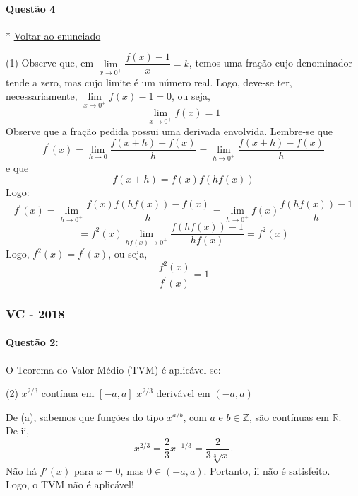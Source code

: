 \documentclass[12pt,a4paper]{article}
\begin{document}
\paragraph{Questão 4} \hfill \scriptsize \hypertarget{calculove12017q4ida}{* }\hyperlink{calculove12017q4volta}{Voltar ao enunciado} \normalsize

\begin{tasks}(1)
\task Observe que, em $\lim\limits_{x\to 0^+} \dfrac{f(x)-1}{x} = k$, temos uma fração cujo denominador tende a zero, mas cujo limite é um número real. Logo, deve-se ter, necessariamente, $\lim\limits_{x\to 0^+}f(x) - 1 = 0$, ou seja, $$\lim\limits_{x\to 0^+} f(x) = 1$$
\task Observe que a fração pedida possui uma derivada envolvida. Lembre-se que $$f^{\prime}(x) = \lim\limits_{h\to 0} \dfrac{f(x+h) - f(x)}{h} = \lim\limits_{h\to 0^+} \dfrac{f(x+h) - f(x)}{h}$$ e que $$f(x+h) = f(x) f(hf(x))$$
Logo: $$f^{\prime}(x) = \lim\limits_{h\to 0^+} \dfrac{f(x) f(hf(x)) - f(x)}{h} = \lim\limits_{h\to 0^+} f(x)\dfrac{f(hf(x)) - 1}{h}$$ $$ = f^2(x)\lim\limits_{hf(x)\to 0^+} \dfrac{f(hf(x)) - 1}{hf(x)} = f^2(x)$$ Logo, $f^2(x) = f^{\prime}(x)$, ou seja,  $$\dfrac{f^2(x)}{f^{\prime}(x) } = 1$$

\end{tasks}

\newpage

\subsubsection{VC - 2018}

\paragraph{Questão 2:}

O Teorema do Valor Médio (TVM) é aplicável se: 
    \begin{tasks}(2)
        \task $x^{2/3}$ contínua em $\left[-a, a\right]$
        \task $x^{2/3}$ derivável em $\left(-a, a\right)$        
    \end{tasks}

    De (a), sabemos que funções do tipo $x^{a/b}$, com $a$ e $b \in \mathbb{Z}$, são contínuas em $\mathbb{R}$.\\
    De ii, $$x^{2/3} = \dfrac{2}{3}x^{-1/3} = \dfrac{2}{3 \sqrt[3]{x}}. $$
    Não há $f'(x)$ para $x=0$, mas $0 \in \left(-a, a\right)$.
    Portanto, ii não é satisfeito.\\
    Logo, o TVM não é aplicável!
\end{document}
